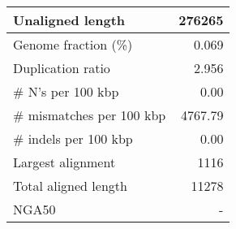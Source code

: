 \documentclass[12pt,a4paper]{article}
\begin{document}
\begin{table}[ht]
\begin{center}
\begin{tabular}{|l*{1}{|r}|}
Unaligned length & 276265 \\ \hline
Genome fraction (\%) & 0.069 \\ \hline
Duplication ratio & 2.956 \\ \hline
\# N's per 100 kbp & 0.00 \\ \hline
\# mismatches per 100 kbp & 4767.79 \\ \hline
\# indels per 100 kbp & 0.00 \\ \hline
Largest alignment & 1116 \\ \hline
Total aligned length & 11278 \\ \hline
NGA50 & - \\ \hline
\end{tabular}
\end{center}
\end{table}
\end{document}
